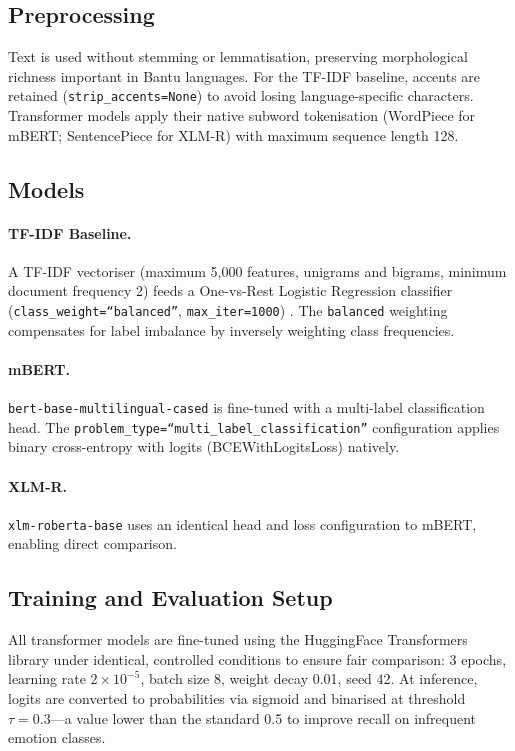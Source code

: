 \documentclass[11pt]{article}
\begin{document}
\subsection{Preprocessing}

Text is used without stemming or lemmatisation, preserving morphological
richness important in Bantu languages.
For the TF-IDF baseline, accents are retained (\texttt{strip\_accents=None})
to avoid losing language-specific characters.
Transformer models apply their native subword tokenisation (WordPiece for
mBERT; SentencePiece for XLM-R) with maximum sequence length 128.

\subsection{Models}

\paragraph{TF-IDF Baseline.}
A TF-IDF vectoriser (maximum 5{,}000 features, unigrams and bigrams,
minimum document frequency 2) feeds a One-vs-Rest Logistic Regression
classifier (\texttt{class\_weight=``balanced''}, \texttt{max\_iter=1000})
\citep{scikit-learn}.
The \texttt{balanced} weighting compensates for label imbalance by inversely
weighting class frequencies.

\paragraph{mBERT.}
\texttt{bert-base-multilingual-cased} \citep{devlin2019bert} is fine-tuned
with a multi-label classification head.
The \texttt{problem\_type=``multi\_label\_classification''} configuration
applies binary cross-entropy with logits (BCEWithLogitsLoss) natively.

\paragraph{XLM-R.}
\texttt{xlm-roberta-base} \citep{conneau2020unsupervised} uses an identical
head and loss configuration to mBERT, enabling direct comparison.

\subsection{Training and Evaluation Setup}

All transformer models are fine-tuned using the HuggingFace Transformers
library \citep{wolf-etal-2020-transformers} under identical, controlled
conditions to ensure fair comparison: 3 epochs, learning rate
$2 \times 10^{-5}$,
batch size 8, weight decay 0.01, seed 42.
At inference, logits are converted to probabilities via sigmoid and binarised
at threshold $\tau = 0.3$---a value lower than the standard 0.5 to improve
recall on infrequent emotion classes.
\end{document}
